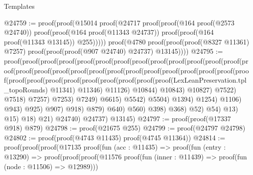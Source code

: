 \begin{lexlean}{Templates}
\begin{coremodule}
@24759 := proof(proof(@15014
        proof(@24717
            proof(proof(@164 proof(@2573 @24740))
                proof(proof(@164 proof(@11343 @24737))
                    proof(proof(@164 proof(@11343 @13145)) @255)))))
      proof(@4780
          proof(proof(proof(@8327 @11361) @7257) proof(proof(proof(@907 @24740) @24737) @13145))))
@24795 := proof(proof(proof(proof(proof(proof(proof(proof(proof(proof(proof(proof(proof(proof(proof(proof(proof(proof(proof(proof(proof(proof(proof(proof(proof(proof(proof(proof(proof(proof(proof(proof(proof(proof(proof(proof(LexLeanPreservation.tpl_topoRounds)
                                                                          @11341)
                                                                        @11346)
                                                                      @11126)
                                                                    @10844)
                                                                  @10843)
                                                                @10827)
                                                              @7522)
                                                            @7518)
                                                          @7257)
                                                        @7253)
                                                      @7249)
                                                    @6615)
                                                  @5542)
                                                @5504)
                                              @1394)
                                            @1254)
                                          @1106)
                                        @943)
                                      @925)
                                    @907)
                                  @918)
                                @879)
                              @640)
                            @560)
                          @398)
                        @368)
                      @52)
                    @54)
                  @13)
                @15)
              @18)
            @21)
          @24740)
        @24737)
      @13145)
@24797 := proof(proof(@17337 @918) @879)
@24798 := proof(@21675 @255)
@24799 := proof(@24797 @24798)
@24802 := proof(proof(@4743 @11435) proof(@4745 @11364))
@24814 := proof(proof(proof(@17135
          proof(fun (acc : @11435) =>
            proof(fun (entry : @13290) =>
              proof(proof(proof(@11576
                      proof(fun (inner : @11439) => proof(fun (node : @11506) => @12989)))

\end{coremodule}
\end{lexlean}
